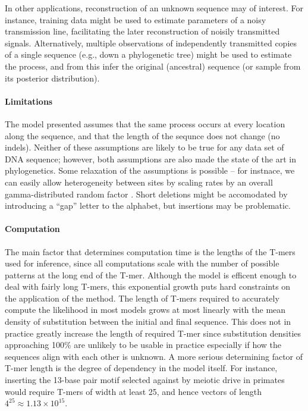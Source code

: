 \documentclass{article}
\theoremstyle{plain}
\theoremstyle{definition}
\begin{document}
In other applications, reconstruction of an unknown sequence may of interest.
For instance, training data might be used to estimate parameters of a noisy transmission line,
facilitating the later reconstruction of noisily transmitted signals.
Alternatively, multiple observations of independently transmitted copies of a single sequence
(e.g., down a phylogenetic tree)
might be used to estimate the process, and from this infer the original (ancestral) sequence
(or sample from its posterior distribution).

\paragraph{Limitations}
The model presented assumes that the same process occurs at every location along the sequence,
and that the length of the sequnce does not change (no indels).
Neither of these assumptions are likely to be true for any data set of DNA sequence;
however, both assumptions are also made the state of the art in phylogenetics.
Some relaxation of the assumptions is possible -- for instnace,
we can easily allow heterogeneity between sites by scaling rates by an overall gamma-distributed random factor \citep{yang1994maximum}.
Short deletions might be accomodated by introducing a ``gap'' letter to the alphabet,
but insertions may be problematic.


\paragraph{Computation}
The main factor that determines computation time
is the lengths of the T-mers used for inference,
since all computations scale with the number of possible patterns at the long end of the T-mer.
Although the model is efficent enough to deal with fairly long T-mers,
this exponential growth puts hard constraints on the application of the method.
The length of T-mers required to accurately compute the likelihood in most models grows at most linearly
with the mean density of substitution between the initial and final sequence.
This does not in practice greatly increase the length of required T-mer
since substitution densities approaching 100\% are unlikely to be usable in practice
especially if how the sequences align with each other is unknown.
A more serious determining factor of T-mer length is the degree of dependency in the model itself.
For instance, inserting the 13-base pair motif selected against by meiotic drive in primates \citep{myers2010drive}
would require T-mers of width at least 25, and hence vectors of length $4^25 \approx 1.13 \times 10^15$.
\end{document}
